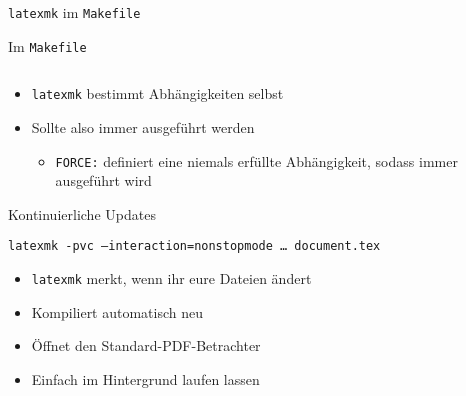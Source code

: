 \begin{frame}[fragile]{\texttt{latexmk} im \texttt{Makefile}}
  \begin{block}{Im \texttt{Makefile}}
    \inputminted{make}{example-files/Latexmk}
  \end{block}

  \begin{itemize}
    \item \texttt{latexmk} bestimmt Abhängigkeiten selbst
    \item Sollte also immer ausgeführt werden
      \begin{itemize}
        \item \texttt{FORCE:} definiert eine niemals erfüllte Abhängigkeit, sodass immer ausgeführt wird
      \end{itemize}
  \end{itemize}
\end{frame}
\begin{frame}{Kontinuierliche Updates}
  \begin{center}
    \texttt{latexmk \alert{-pvc} --interaction=nonstopmode … document.tex}
  \end{center}
  \begin{itemize}
    \item \texttt{latexmk} merkt, wenn ihr eure Dateien ändert
    \item Kompiliert automatisch neu
    \item Öffnet den Standard-PDF-Betrachter
    \item Einfach im Hintergrund laufen lassen
  \end{itemize}
\end{frame}
